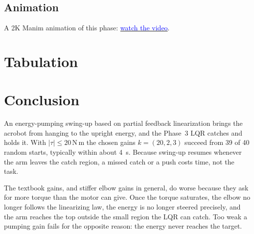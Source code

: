 \documentclass[12pt,a4paper]{article}
\newcommand{\Nm}{\,\mathrm{N\,m}}
\begin{document}



\subsection{Animation}
A 2K Manim animation of this phase: \href{https://drive.google.com/file/d/1jPQRn3W-bvUyvSKlHvYmX74bfPX9N16P/view?usp=sharing}{\textcolor{blue}{watch the video}}.

\section{Tabulation}
\begin{table}[H]
\centering
\caption{Summary of the swing-up designs (40 random starts near hanging)}
\end{table}

\section{Conclusion}
An energy-pumping swing-up based on partial feedback linearization brings the acrobot from hanging to the upright energy, and the Phase~3 LQR catches and holds it. With $|\tau|\le20\Nm$ the chosen gains $k=(20,2,3)$ succeed from 39 of 40 random starts, typically within about 4~s. Because swing-up resumes whenever the arm leaves the catch region, a missed catch or a push costs time, not the task.

The textbook gains, and stiffer elbow gains in general, do worse because they ask for more torque than the motor can give. Once the torque saturates, the elbow no longer follows the linearizing law, the energy is no longer steered precisely, and the arm reaches the top outside the small region the LQR can catch. Too weak a pumping gain fails for the opposite reason: the energy never reaches the target.
\end{document}
